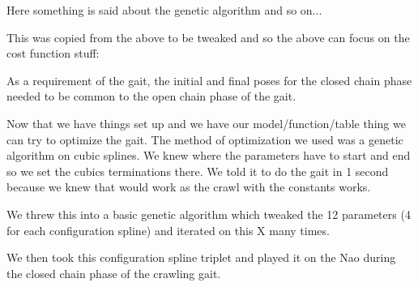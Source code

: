 Here something is said about the genetic algorithm and so on...

This was copied from the above to be tweaked and so the above can focus on the cost function stuff:

As a requirement of the gait, the initial and final poses for the closed chain phase needed to be common to the
open chain phase of the gait. 

Now that we have things set up and we have our model/function/table thing we can try to optimize the gait.
The method of optimization we used was a genetic algorithm on cubic splines. We knew where the parameters have to start
and end so we set the cubics terminations there. We told it to do the gait in 1 second because we knew that would work
as the crawl with the constants works.

We threw this into a basic genetic algorithm which tweaked the 12 parameters (4 for each configuration spline)
and iterated on this X many times. 

We then took this configuration spline triplet and played it on the Nao during the closed chain phase of the crawling gait.